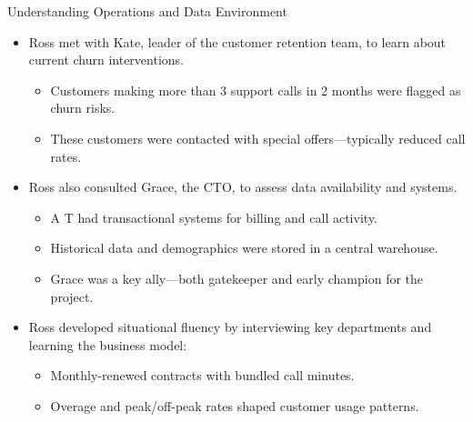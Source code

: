 \documentclass[aspectratio=169,xcolor=dvipsnames]{beamer}
\begin{document}
\begin{frame}{Understanding Operations and Data Environment}

\begin{itemize}
  \item Ross met with Kate, leader of the customer retention team, to learn about current churn interventions.
  \begin{itemize}
    \item Customers making more than 3 support calls in 2 months were flagged as churn risks.
    \item These customers were contacted with special offers—typically reduced call rates.
  \end{itemize}
  \item Ross also consulted Grace, the CTO, to assess data availability and systems.
  \begin{itemize}
    \item A T had transactional systems for billing and call activity.
    \item Historical data and demographics were stored in a central warehouse.
    \item Grace was a key ally—both gatekeeper and early champion for the project.
  \end{itemize}
  \item Ross developed situational fluency by interviewing key departments and learning the business model:
  \begin{itemize}
    \item Monthly-renewed contracts with bundled call minutes.
    \item Overage and peak/off-peak rates shaped customer usage patterns.
  \end{itemize}
\end{itemize}

\end{frame}
\end{document}
